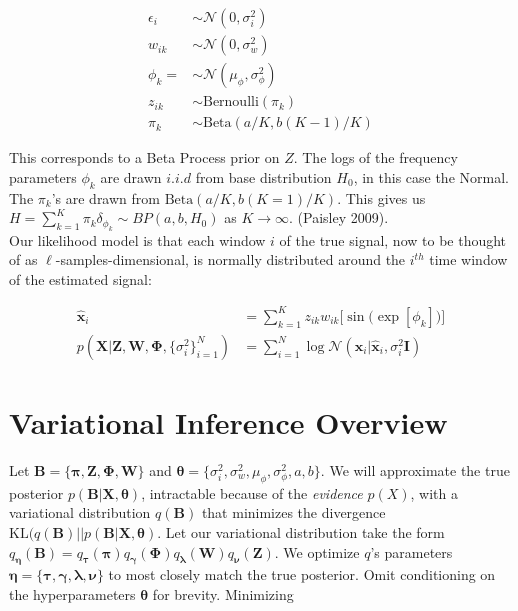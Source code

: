 \documentclass[11pt]{article}
\theoremstyle{definition}
\theoremstyle{plain}
\newcommand{\Beta}{\text{Beta}}
\newcommand{\Bernoulli}{\text{Bernoulli}}
\newcommand{\KL}{\text{KL}}
\begin{document}
\begin{align*}
    \epsilon_i &\sim \mathcal{N}(0, \sigma^2_i)\\
    w_{ik} &\sim \mathcal{N}(0, \sigma^2_w)\\
    \phi_k = &\sim \mathcal{N}(\mu_{\phi}, \sigma^2_{\phi})\\
    z_{ik} &\sim \Bernoulli(\pi_k)\\
    \pi_k &\sim \Beta(a/K, b(K-1)/K)
\end{align*}

\noindent This corresponds to a Beta Process prior on $Z$. The logs of the frequency parameters 
$\phi_k$ are drawn $i.i.d$ from base distribution $H_0$, in this case the Normal.
The $\pi_k$'s are drawn from $\Beta(a/K,b(K=1)/K)$. This gives us $H = \sum_{k=1}^K \pi_k \delta_{\phi_k} \sim BP(a,b,H_0)$ as $K \rightarrow \infty$. (Paisley 2009).\\

\noindent Our likelihood model is that each window $i$ of the true signal, now to be thought of as $\ell$-samples-dimensional, is normally distributed around the $i^{th}$
time window of the estimated signal:

\begin{align*}
    \hat{\mathbf{x}}_i &= \sum_{k=1}^K z_{ik}w_{ik}\big[\sin\big(\exp[\phi_k]\big)\big]\\
    p(\mathbf{X} |\mathbf{Z}, \mathbf{W}, \boldsymbol{\Phi},\{\sigma^2_i\}_{i=1}^N) &= \sum_{i=1}^N \log \mathcal{N}(\mathbf{x}_i | \hat{\mathbf{x}}_i, \sigma^2_i\mathbf{I})
\end{align*}


\section{Variational Inference Overview}

\noindent Let $\mathbf{B} = \{\boldsymbol{\pi}, \mathbf{Z}, \mathbf{\Phi}, \mathbf{W}\}$ and 
$\boldsymbol{\theta} = \{\sigma^2_i, \sigma^2_w, \mu_{\phi}, \sigma^2_\phi, a, b \}$. 
We will approximate the true posterior $p(\mathbf{B}|\mathbf{X},\boldsymbol{\theta})$, intractable because of the \textit{evidence} $p(X)$,
with a variational distribution $q(\mathbf{B})$ that minimizes the divergence $\KL(q(\mathbf{B}) || p(\mathbf{B}|\mathbf{X},\boldsymbol{\theta})$. 
Let our variational distribution take the form $q_{\boldsymbol{\eta}}(\mathbf{B}) = q_{\boldsymbol{\tau}}(\boldsymbol{\pi}) q_{\boldsymbol{\gamma}}(\boldsymbol{\Phi}) 
q_{\boldsymbol{\lambda}}(\mathbf{W}) q_{\boldsymbol{\nu}}(\mathbf{Z})$. We optimize $q$'s parameters $\boldsymbol{\eta} = \{\boldsymbol{\tau}, \boldsymbol{\gamma}, 
\boldsymbol{\lambda}, \boldsymbol{\nu}\}$ to most closely match the true posterior. Omit conditioning on the hyperparameters $\boldsymbol{\theta}$ for brevity. Minimizing 
\end{document}

